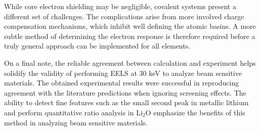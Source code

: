 While core electron shielding may be negligible, covalent systems present a different set of challenges. The complications arise from more involved charge compensation mechanisms, which inhibit well defining the atomic basins.  A more subtle method of determining the electron response is therefore required before a truly general approach can be implemented for all elements.  

On a  final note, the reliable agreement between calculation and experiment helps solidify the validity of performing EELS at 30 keV to analyze beam sensitive materials.  The obtained experimental results were successful in reproducing agreement with the literature predictions when ignoring screening effects.  The ability to detect fine features such as the small second peak in metallic lithium and perform quantitative ratio analysis in $ \mathrm{Li_2O} $ emphasize the benefits of this method in analyzing beam sensitive materials.  \\








